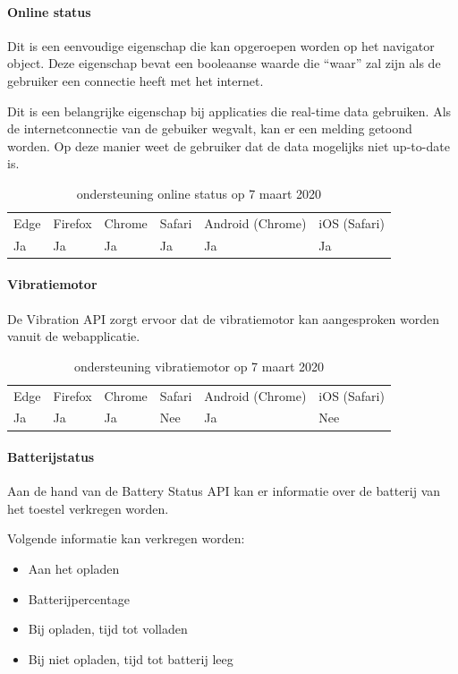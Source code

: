 	\paragraph{Online status}
	
	Dit is een eenvoudige eigenschap die kan opgeroepen worden op het navigator object. Deze eigenschap bevat een booleaanse waarde die “waar” zal zijn als de gebruiker een connectie heeft met het internet. 
	
	Dit is een belangrijke eigenschap bij applicaties die real-time data gebruiken. Als de internetconnectie van de gebuiker wegvalt, kan er een melding  getoond worden. Op deze manier weet de gebruiker dat de data mogelijks niet up-to-date is.
	\begin{table}[H]
		\centering
		\begin{tabular}{llllll}
			Edge & Firefox & Chrome & Safari & Android (Chrome) & iOS (Safari) \\
			Ja   & Ja      &  Ja     & Ja     & Ja               & Ja          
		\end{tabular}	
		\caption{ondersteuning online status op 7 maart 2020}
	\end{table}
	
	\paragraph{Vibratiemotor }
	
	De Vibration API \autocite{Kostionen2018} zorgt ervoor dat de vibratiemotor kan aangesproken worden vanuit de webapplicatie.
	
	\begin{table}[H]
		\begin{tabular}{llllll}
			Edge & Firefox & Chrome & Safari & Android (Chrome) & iOS (Safari) \\
			Ja   & Ja      &  Ja     & Nee     & Ja               & Nee          
		\end{tabular}	
		\caption{ondersteuning vibratiemotor  op 7 maart 2020}
	\end{table}
	
	
	\paragraph{Batterijstatus}
	
	Aan de hand van de Battery Status API \autocite{Kostiainen2016} kan er informatie over de batterij van het toestel verkregen worden.
	
	Volgende informatie kan verkregen worden:
	 \begin{itemize}
		\item	Aan het opladen
		\item	Batterijpercentage
		\item	Bij opladen, tijd tot volladen
		\item	Bij niet opladen, tijd tot batterij leeg
	\end{itemize}
	
